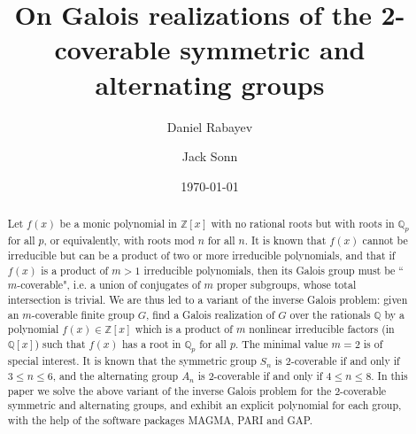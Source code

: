 \documentclass[reqno,12pt]{amsart}
\theoremstyle{remark}
\theoremstyle{definition}
\theoremstyle{citing}
\numberwithin{theorem}{section}
\numberwithin{equation}{section}
\begin{document}
\author{Daniel Rabayev}
\address{
Department of Mathematics\\
Technion --- Israel Institute of Technology\\
Haifa, 32000\\
Israel }
\author{Jack Sonn}
\address{
Department of Mathematics\\
Technion --- Israel Institute of Technology\\
Haifa, 32000\\
Israel }

\title[2-coverable symmetric and alternating groups]{On Galois realizations of the 2-coverable symmetric and alternating groups}
\date{\today}

\begin{abstract}
Let $f(x)$ be a monic polynomial in $\mathbb{Z}[x]$ with no
rational roots but with roots in $\mathbb{Q}_p$ for all $p$, or
equivalently, with roots mod $n$ for all $n$. It is known that
$f(x)$ cannot be irreducible but can be a product of two or more
irreducible polynomials, and that if $f(x)$ is a product of $m>1$
irreducible polynomials, then its Galois group must be ``$m$-coverable", i.e. a union of
conjugates of $m$ proper subgroups, whose total intersection is trivial.  We are thus led to a variant of the inverse Galois problem: given an $m$-coverable finite group $G$, find a Galois realization of $G$ over the rationals $\mathbb{Q}$ by a polynomial $f(x) \in \mathbb{Z}[x]$ which is a product of $m$ nonlinear irreducible factors (in $\mathbb{Q}[x]$) such that $f(x)$ has a root in $\mathbb{Q}_p$ for all $p$.
The minimal value $m=2$ is
 of special interest.  It is known that the symmetric group $S_n$ is $2$-coverable if and only if $3\leq n\leq6$, and the alternating group $A_n$ is $2$-coverable if and only if $4\leq n\leq8$.
 In this paper we solve the above variant of the inverse Galois problem for the $2$-coverable symmetric and alternating groups, and exhibit an explicit polynomial for each group, with the help of the software packages MAGMA, PARI and GAP.  

\end{abstract}
\maketitle
\end{document}
